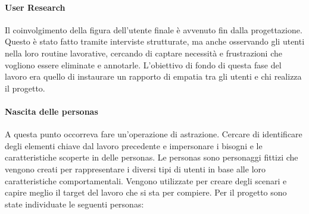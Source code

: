 \paragraph{User Research}
Il coinvolgimento della figura dell'utente finale è avvenuto fin dalla progettazione. Questo è stato fatto tramite interviste strutturate, ma anche osservando gli utenti nella loro routine lavorative, cercando di captare necessità e frustrazioni che vogliono essere eliminate e annotarle. L'obiettivo di fondo di questa fase del lavoro era quello di instaurare un rapporto di empatia tra gli utenti e chi realizza il progetto.

\paragraph{Nascita delle personas}
A questa punto occorreva fare un'operazione di astrazione. Cercare di identificare degli elementi chiave dal lavoro precedente e impersonare i bisogni e le caratteristiche scoperte in delle personas. Le personas sono personaggi fittizi che vengono creati per rappresentare i diversi tipi di utenti in base alle loro caratteristiche comportamentali. Vengono utilizzate per creare degli scenari e capire meglio il target del lavoro che si sta per compiere. Per il progetto sono state individuate le seguenti personas:
